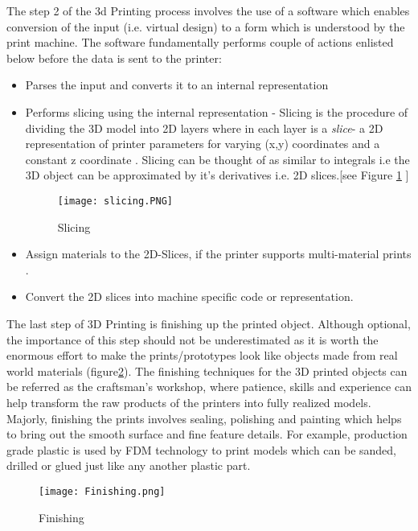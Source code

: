 The step 2 of the 3d Printing process involves the use of a software which enables conversion of the input (i.e. virtual design) to a form which is understood by the print machine. The software fundamentally performs couple of actions enlisted below before the data is sent to the printer:
\begin{itemize}
\item Parses the input and converts it to an internal representation
\item Performs slicing using the internal representation - Slicing is the procedure of dividing the 3D model into 2D layers where in each layer is a \textsl{slice}- a 2D representation of printer parameters for varying (x,y) coordinates and a constant z coordinate . Slicing can be thought of as similar to integrals i.e the 3D object can be approximated by it's derivatives i.e. 2D slices.[see Figure \ref{fig:slicing} \cite{slicing}]
\begin{figure}[ht!]
\centering
\texttt{[image: slicing.PNG]}
\caption{Slicing}
\label{fig:slicing}
\end{figure}

\item Assign materials to the 2D-Slices, if the printer supports multi-material prints . 
\item Convert the 2D slices into machine specific code or representation.
\end{itemize}

The last step of 3D Printing is finishing up the printed object. Although optional, the importance of this step should not be underestimated as it is worth the enormous effort to make the prints/prototypes look like objects made from real world materials (figure\ref{fig:Finishing}). The finishing techniques for the 3D printed objects can be referred as the craftsman's workshop, where patience, skills and experience can help transform the raw products of the printers into fully realized models. Majorly, finishing the prints involves sealing, polishing and painting which helps to bring out the smooth surface and fine feature details. For example, production grade plastic is used by FDM technology to print models which can be sanded, drilled or glued just like any another plastic part. 

\begin{figure}[ht!]
\centering
\texttt{[image: Finishing.png]}
\caption{Finishing}
\label{fig:Finishing}
\end{figure}


